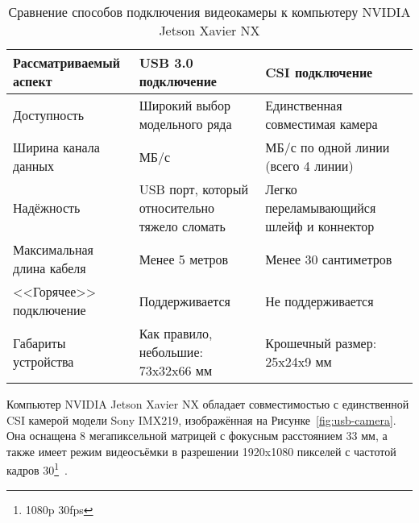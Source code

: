 \begin{table} [htbp]
    \centering
    \begin{threeparttable}%
        \caption{Сравнение способов подключения видеокамеры к компьютеру NVIDIA Jetson Xavier NX}\label{tab:CameraCompare}%
        \begin{tabular}{| p{4cm} || p{6cm} | p{6cm}l |}
            \hline
            Рассматриваемый аспект       & \centering USB 3.0 подключение                                                 & \centering CSI подключение                                                     & \\
            \hline
            Доступность                              & \centering  Широкий выбор модельного ряда                             & \centering Единственная совместимая камера                     & \\
            \hline
            Ширина канала данных           & \centering  400 МБ/с                                                                       & \centering  320 МБ/с по одной линии (всего 4 линии)           & \\
            \hline
            Надёжность                              & \centering  USB порт, который относительно тяжело сломать & \centering Легко переламывающийся шлейф и коннектор & \\
            \hline
            Максимальная длина кабеля & \centering  Менее 5 метров                                                            & \centering  Менее 30 сантиметров                                          & \\
            \hline
            <<Горячее>> подключение    & \centering  Поддерживается                                                          & \centering  Не поддерживается                                              & \\
            \hline
            Габариты устройства              & \centering  Как правило, небольшие: 73x32x66 мм                      & \centering  Крошечный размер: 25x24x9 мм                          & \\
            \hline
        \end{tabular}
    \end{threeparttable}
\end{table}

Компьютер NVIDIA Jetson Xavier NX обладает совместимостью с единственной CSI камерой модели Sony IMX219, изображённая на Рисунке~\cref{fig:usb-camera}. Она оснащена 8 мегапиксельной матрицей с фокусным расстоянием 33 мм, а также имеет режим видеосъёмки в разрешении 1920x1080 пикселей с частотой кадров 30\footnote{1080p 30fps}~\cite{csi-camera}.

